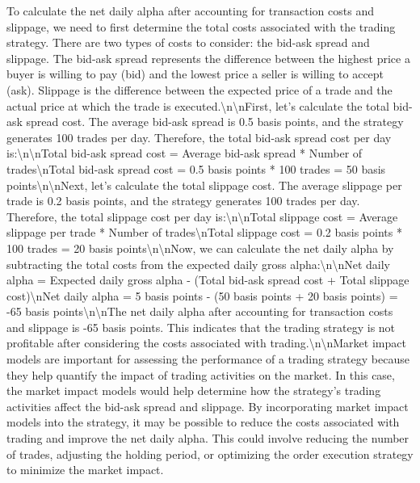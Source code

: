 \documentclass{article}%
\begin{document}
\begin{description}
To calculate the net daily alpha after accounting for transaction costs and slippage, we need to first determine the total costs associated with the trading strategy. There are two types of costs to consider: the bid{-}ask spread and slippage. The bid{-}ask spread represents the difference between the highest price a buyer is willing to pay (bid) and the lowest price a seller is willing to accept (ask). Slippage is the difference between the expected price of a trade and the actual price at which the trade is executed.\textbackslash{}n\textbackslash{}nFirst, let's calculate the total bid{-}ask spread cost. The average bid{-}ask spread is 0.5 basis points, and the strategy generates 100 trades per day. Therefore, the total bid{-}ask spread cost per day is:\textbackslash{}n\textbackslash{}nTotal bid{-}ask spread cost = Average bid{-}ask spread * Number of trades\textbackslash{}nTotal bid{-}ask spread cost = 0.5 basis points * 100 trades = 50 basis points\textbackslash{}n\textbackslash{}nNext, let's calculate the total slippage cost. The average slippage per trade is 0.2 basis points, and the strategy generates 100 trades per day. Therefore, the total slippage cost per day is:\textbackslash{}n\textbackslash{}nTotal slippage cost = Average slippage per trade * Number of trades\textbackslash{}nTotal slippage cost = 0.2 basis points * 100 trades = 20 basis points\textbackslash{}n\textbackslash{}nNow, we can calculate the net daily alpha by subtracting the total costs from the expected daily gross alpha:\textbackslash{}n\textbackslash{}nNet daily alpha = Expected daily gross alpha {-} (Total bid{-}ask spread cost + Total slippage cost)\textbackslash{}nNet daily alpha = 5 basis points {-} (50 basis points + 20 basis points) = {-}65 basis points\textbackslash{}n\textbackslash{}nThe net daily alpha after accounting for transaction costs and slippage is {-}65 basis points. This indicates that the trading strategy is not profitable after considering the costs associated with trading.\textbackslash{}n\textbackslash{}nMarket impact models are important for assessing the performance of a trading strategy because they help quantify the impact of trading activities on the market. In this case, the market impact models would help determine how the strategy's trading activities affect the bid{-}ask spread and slippage. By incorporating market impact models into the strategy, it may be possible to reduce the costs associated with trading and improve the net daily alpha. This could involve reducing the number of trades, adjusting the holding period, or optimizing the order execution strategy to minimize the market impact.%

\end{description}
\end{document}
